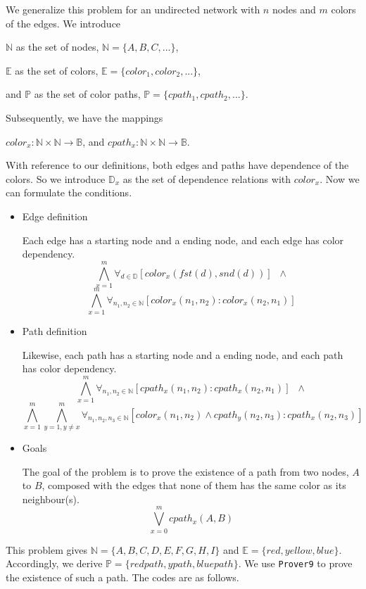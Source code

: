 We generalize this problem for an undirected network with $n$ nodes and $m$ colors of the edges. We introduce 
\begin{center}
$\mathbb{N}$ as the set of nodes, $\mathbb{N} = \{A, B, C, ... \}$, 

$\mathbb{E}$ as the set of colors, $\mathbb{E} = \{color_1, color_2, ...\}$, 

and $\mathbb{P}$ as the set of color paths, $\mathbb{P} = \{cpath_1, cpath_2, ...\}$. 
\end{center}
Subsequently, we have the mappings
\begin{center}
$color_x : \mathbb{N}\times \mathbb{N} \rightarrow \mathbb{B}$, and $cpath_x : \mathbb{N}\times \mathbb{N} \rightarrow \mathbb{B}$.
\end{center}

With reference to our definitions, both edges and paths have dependence of the colors. So we introduce $\mathbb{D}_x$ as the set of dependence relations with $color_x$. Now we can formulate the conditions.

\begin{itemize}
  \item Edge definition
  
  Each edge has a starting node and a ending node, and each edge has color dependency.
  \[ \bigwedge_{x=1}^m \forall_{d \in \mathbb{D}} [color_x(fst(d), snd(d))] \;\; \wedge \]
  \[ \bigwedge_{x=1}^m \forall_{n_1, n_2 \in \mathbb{N}} [color_x(n_1, n_2) : color_x(n_2, n_1)] \]
  
  \item Path definition
  
  Likewise, each path has a starting node and a ending node, and each path has color dependency.
  \[ \bigwedge_{x=1}^m \forall_{n_1, n_2 \in \mathbb{N}} [cpath_x(n_1, n_2) : cpath_x(n_2, n_1)] \;\; \wedge \]
  \[ \bigwedge_{x=1}^m \bigwedge_{y=1,y\neq x}^m \forall_{n_1, n_2, n_3 \in \mathbb{N}} [color_x(n_1, n_2) \wedge cpath_y(n_2, n_3) : cpath_x(n_2, n_3)] \]
  
  \item Goals
  
  The goal of the problem is to prove the existence of a path from two nodes, $A$ to $B$, composed with the edges that none of them has the same color as its neighbour(s).
  \[ \bigvee_{x=0}^m cpath_x(A, B) \]
  
\end{itemize}

This problem gives $\mathbb{N} = \{A, B, C, D, E, F, G, H, I \}$ and $\mathbb{E} = \{red, yellow, blue \}$. Accordingly, we derive $\mathbb{P} = \{redpath, ypath, bluepath\}$. We use {\tt Prover9} to prove the existence of such a path. The codes are as follows.

